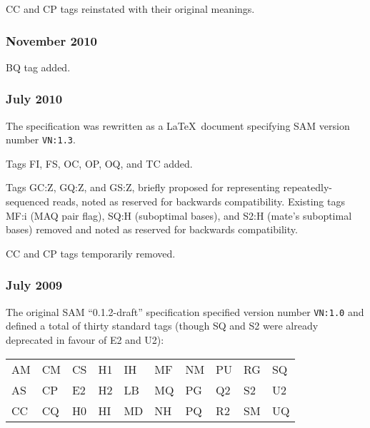 \documentclass[10pt]{article}
\begin{document}
\begin{appendices}
CC and CP tags reinstated with their original meanings.

\subsubsection*{November 2010}

BQ tag added.

\subsubsection*{July 2010}

The specification was rewritten as a \LaTeX\ document specifying SAM version number {\tt VN:1.3}.

\gap
Tags FI, FS, OC, OP, OQ, and TC added.

Tags GC:Z, GQ:Z, and GS:Z, briefly proposed for representing repeatedly-sequenced reads, noted as reserved for backwards compatibility.
Existing tags MF:i (MAQ pair flag), SQ:H (suboptimal bases), and S2:H (mate's suboptimal bases) removed and noted as reserved for backwards compatibility.

CC and CP tags temporarily removed.

\subsubsection*{July 2009}

\begin{samepage}
The original SAM ``0.1.2-draft'' specification specified version number {\tt VN:1.0} and defined a total of thirty standard tags (though SQ and S2 were already deprecated in favour of E2 and U2):

\begin{center}
\begin{tabular}{l*{9}{@{\qquad}l}}
AM & CM & CS & H1 & IH & MF & NM & PU & RG & SQ \\
AS & CP & E2 & H2 & LB & MQ & PG & Q2 & S2 & U2 \\
CC & CQ & H0 & HI & MD & NH & PQ & R2 & SM & UQ
\end{tabular}
\end{center}
\end{samepage}

\end{appendices}
\end{document}
